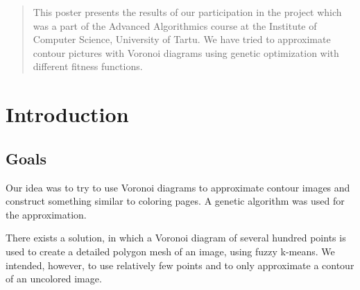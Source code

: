 \documentclass[a1,portrait]{a0poster}
\begin{document}
\def\columnseprulecolor{\color{tu}}
\begin{multicols}{2} %


\color{tu} %

\begin{abstract}
This poster presents the results of our participation in the project which was a part of the Advanced Algorithmics course at the Institute of Computer Science, University of Tartu. We have tried to approximate contour pictures with Voronoi diagrams using genetic optimization with different fitness functions.

\end{abstract}


\color{Black} %

\section*{Introduction}

\subsection*{Goals}
Our idea was to try to use Voronoi diagrams to approximate contour images and construct something similar to coloring pages.
A genetic algorithm was used for the approximation.

There exists a solution, in which a Voronoi diagram of several hundred points is used to
create a detailed polygon mesh of an image, using fuzzy k-means. We intended, however, to use relatively few points and to only approximate a contour of an uncolored image.  


\end{multicols}
\end{document}
